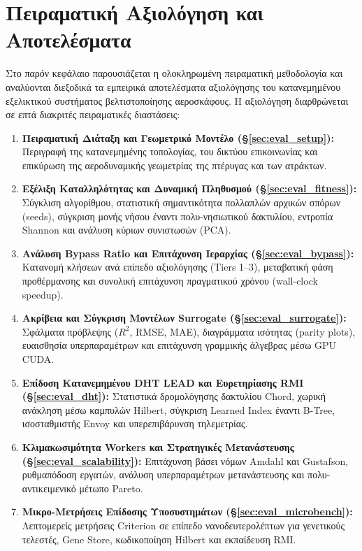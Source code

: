 
\chapter{Πειραματική Αξιολόγηση και Αποτελέσματα}
\label{ch:evaluation}

Στο παρόν κεφάλαιο παρουσιάζεται η ολοκληρωμένη πειραματική μεθοδολογία και αναλύονται διεξοδικά τα εμπειρικά αποτελέσματα αξιολόγησης του κατανεμημένου εξελικτικού συστήματος βελτιστοποίησης αεροσκάφους. Η αξιολόγηση διαρθρώνεται σε επτά διακριτές πειραματικές διαστάσεις:
\begin{enumerate}
    \item \textbf{Πειραματική Διάταξη και Γεωμετρικό Μοντέλο (\S\ref{sec:eval_setup}):} Περιγραφή της κατανεμημένης τοπολογίας, του δικτύου επικοινωνίας και επικύρωση της αεροδυναμικής γεωμετρίας της πτέρυγας και των ατράκτων.
    \item \textbf{Εξέλιξη Καταλληλότητας και Δυναμική Πληθυσμού (\S\ref{sec:eval_fitness}):} Σύγκλιση αλγορίθμου, στατιστική σημαντικότητα πολλαπλών αρχικών σπόρων (seeds), σύγκριση μονής νήσου έναντι πολυ-νησιωτικού δακτυλίου, εντροπία Shannon και ανάλυση κύριων συνιστωσών (PCA).
    \item \textbf{Ανάλυση Bypass Ratio και Επιτάχυνση Ιεραρχίας (\S\ref{sec:eval_bypass}):} Κατανομή κλήσεων ανά επίπεδο αξιολόγησης (Tiers 1--3), μεταβατική φάση προθέρμανσης και συνολική επιτάχυνση πραγματικού χρόνου (wall-clock speedup).
    \item \textbf{Ακρίβεια και Σύγκριση Μοντέλων Surrogate (\S\ref{sec:eval_surrogate}):} Σφάλματα πρόβλεψης ($R^2$, RMSE, MAE), διαγράμματα ισότητας (parity plots), ευαισθησία υπερπαραμέτρων και επιτάχυνση γραμμικής άλγεβρας μέσω GPU CUDA.
    \item \textbf{Επίδοση Κατανεμημένου DHT LEAD και Ευρετηρίασης RMI (\S\ref{sec:eval_dht}):} Στατιστικά δρομολόγησης δακτυλίου Chord, χωρική ανάκληση μέσω καμπυλών Hilbert, σύγκριση Learned Index έναντι B-Tree, ισοσταθμιστής Envoy και υπερεπιβάρυνση τηλεμετρίας.
    \item \textbf{Κλιμακωσιμότητα Workers και Στρατηγικές Μετανάστευσης (\S\ref{sec:eval_scalability}):} Επιτάχυνση βάσει νόμων Amdahl και Gustafson, ρυθμαπόδοση εργατών, ανάλυση υπερπαραμέτρων μετανάστευσης και πολυ-αντικειμενικό μέτωπο Pareto.
    \item \textbf{Μικρο-Μετρήσεις Επίδοσης Υποσυστημάτων (\S\ref{sec:eval_microbench}):} Λεπτομερείς μετρήσεις Criterion σε επίπεδο νανοδευτερολέπτων για γενετικούς τελεστές, Gene Store, κωδικοποίηση Hilbert και εκπαίδευση RMI.
\end{enumerate}
